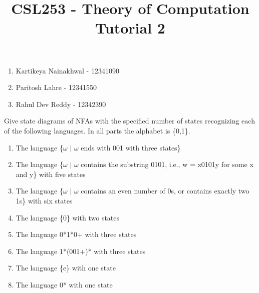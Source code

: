 \documentclass[12pt]{article}
\begin{document}
	
	\title{\Large\textbf{CSL253 - Theory of Computation}\\[0.5em]
		\large Tutorial 2}
	\author{}
	\date{}
	\maketitle
	
	\begin{tcolorbox}[
		title=\textbf{Team Members},
		colback=white,
		colframe=statecol,
		arc=0mm
		]
		\begin{enumerate}[leftmargin=*]
			\item Kartikeya Nainakhwal - 12341090
			\item Paritosh Lahre - 12341550
			\item Rahul Dev Reddy - 12342390
		\end{enumerate}
	\end{tcolorbox}
	
	\begin{tcolorbox}[
		title=\textbf{Question 2},
		colback=white,
		colframe=transitioncol,
		arc=0mm
		]
		Give state diagrams of NFAs with the specified number of states recognizing each of the following languages. In all parts the alphabet is \{0,1\}.
		\begin{enumerate}
			\item The language \{$\omega$ $|$ $\omega$ ends with 001 with three states\}\\
			\item The language \{$\omega$ $|$ $\omega$ contains the substring 0101, i.e., w = x0101y for some x and y\}  with five states\\
			\item The language \{$\omega$ $|$ $\omega$ contains an even number of 0s, or contains exactly two 1s\}  with six states\\ 
			\item The language \{0\} with two states\\
			\item The language 0*1*0+ with three states\\
			\item The language 1*(001+)* with three states\\
			\item The language \{e\} with one state\\
			\item The language 0* with one state
		\end{enumerate}
	\end{tcolorbox}
	
\end{document}
